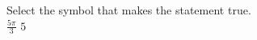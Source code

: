 \documentclass{ximera}
\author{David Kish}
\begin{document}
\begin{exercise}
Select the symbol that makes the statement true.\\
$\frac{5\pi}{3}$ \wordChoice{\choice{$<$}\choice[correct]{$>$}\choice{$=$}} $5$ 

\end{exercise}
\end{document}
